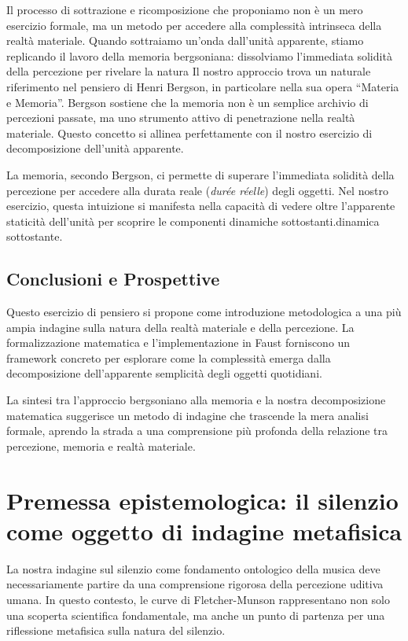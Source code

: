 \documentclass{gs-adonis}
\begin{document}
Il processo di sottrazione e ricomposizione che proponiamo non è un mero
esercizio formale, ma un metodo per accedere alla complessità intrinseca
della realtà materiale. Quando sottraiamo un'onda dall'unità apparente,
stiamo replicando il lavoro della memoria bergsoniana: dissolviamo
l'immediata solidità della percezione per rivelare la natura Il nostro
approccio trova un naturale riferimento nel pensiero di Henri Bergson,
in particolare nella sua opera ``Materia e Memoria''. Bergson sostiene
che la memoria non è un semplice archivio di percezioni passate, ma uno
strumento attivo di penetrazione nella realtà materiale. Questo concetto
si allinea perfettamente con il nostro esercizio di decomposizione
dell'unità apparente.

La memoria, secondo Bergson, ci permette di superare l'immediata
solidità della percezione per accedere alla durata reale (\emph{durée
réelle}) degli oggetti. Nel nostro esercizio, questa intuizione si
manifesta nella capacità di vedere oltre l'apparente staticità
dell'unità per scoprire le componenti dinamiche sottostanti.dinamica
sottostante.

\subsection{Conclusioni e Prospettive}\label{conclusioni-e-prospettive}

Questo esercizio di pensiero si propone come introduzione metodologica a
una più ampia indagine sulla natura della realtà materiale e della
percezione. La formalizzazione matematica e l'implementazione in Faust
forniscono un framework concreto per esplorare come la complessità
emerga dalla decomposizione dell'apparente semplicità degli oggetti
quotidiani.

La sintesi tra l'approccio bergsoniano alla memoria e la nostra
decomposizione matematica suggerisce un metodo di indagine che trascende
la mera analisi formale, aprendo la strada a una comprensione più
profonda della relazione tra percezione, memoria e realtà materiale.

\section{Premessa epistemologica: il silenzio come oggetto di indagine
metafisica}\label{premessa-epistemologica-il-silenzio-come-oggetto-di-indagine-metafisica}

La nostra indagine sul silenzio come fondamento ontologico della musica
deve necessariamente partire da una comprensione rigorosa della
percezione uditiva umana. In questo contesto, le curve di
Fletcher-Munson rappresentano non solo una scoperta scientifica
fondamentale, ma anche un punto di partenza per una riflessione
metafisica sulla natura del silenzio.
\end{document}
